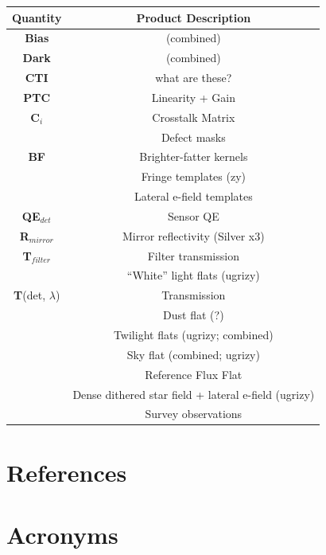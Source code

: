 \documentclass[SE,authoryear,lsstdraft,toc]{lsstdoc}
\begin{document}
\begin{table}[h!]
    \begin{tabular}{|c|c|}
    Quantity & Product Description \\
    \hline \hline
    \textbf{Bias} & (combined) \\
    \hline
    \textbf{Dark} &  (combined) \\
    \hline
    \textbf{CTI} & what are these? \\  
    \hline
    \textbf{PTC} & Linearity + Gain \\
    \hline
    \textbf{C$_{i}$} & Crosstalk Matrix \\
    \hline
     & Defect masks \\
    \hline
    \textbf{BF} & Brighter-fatter kernels \\
    \hline
     & Fringe templates (zy) \\
    \hline
     & Lateral e-field templates \\
    \hline
    \textbf{QE$_{det}$} & Sensor QE \\ 
    \hline
    \textbf{R$_{mirror}$} & Mirror reflectivity (Silver x3) \\
    \hline
    \textbf{T$_{filter}$} & Filter transmission \\
    \hline
     & “White” light flats (ugrizy) \\ 
    \hline
    \textbf{T}(det, $\lambda$) & Transmission \\ 
    \hline
     & Dust flat (?) \\
    \hline
     & Twilight flats (ugrizy; combined) \\
    \hline
     & Sky flat (combined; ugrizy) \\
    \hline
     & Reference Flux Flat \\
    \hline
     & Dense dithered star field + lateral e-field (ugrizy) \\
    \hline
     & Survey observations \\
    \hline
    \end{tabular}
\end{table}


\section{References} \label{sec:bib}
\renewcommand{\refname}{} %


\section{Acronyms} \label{sec:acronyms}

\end{document}
